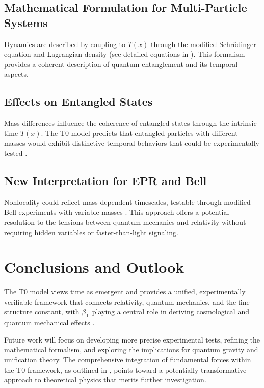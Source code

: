 \documentclass[12pt,a4paper]{article}
\newcommand{\Tfield}{T(x)}
\newcommand{\betaT}{\beta_{\text{T}}}
\begin{document}
	\subsection{Mathematical Formulation for Multi-Particle Systems}
	Dynamics are described by coupling to \(\Tfield\) through the modified Schrödinger equation and Lagrangian density (see detailed equations in \cite{pascher_lagrange_2025}). This formalism provides a coherent description of quantum entanglement and its temporal aspects.
	
	\subsection{Effects on Entangled States}
	Mass differences influence the coherence of entangled states through the intrinsic time \(\Tfield\). The T0 model predicts that entangled particles with different masses would exhibit distinctive temporal behaviors that could be experimentally tested \cite{pascher_feldtheorie_2025}.
	
	\subsection{New Interpretation for EPR and Bell}
	Nonlocality could reflect mass-dependent timescales, testable through modified Bell experiments with variable masses \cite{bell, pascher_photons_2025}. This approach offers a potential resolution to the tensions between quantum mechanics and relativity without requiring hidden variables or faster-than-light signaling.
	
	\section{Conclusions and Outlook}
	The T0 model views time as emergent and provides a unified, experimentally verifiable framework that connects relativity, quantum mechanics, and the fine-structure constant, with \(\betaT\) playing a central role in deriving cosmological and quantum mechanical effects \cite{pascher_galaxies_2025, pascher_alphabeta_2025}.
	
	Future work will focus on developing more precise experimental tests, refining the mathematical formalism, and exploring the implications for quantum gravity and unification theory. The comprehensive integration of fundamental forces within the T0 framework, as outlined in \cite{pascher_grundkraefte_2025}, points toward a potentially transformative approach to theoretical physics that merits further investigation.
	
\end{document}
